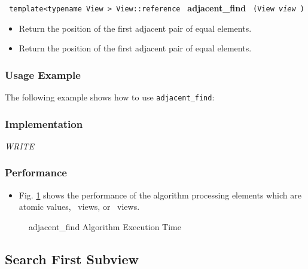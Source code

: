 \noindent
\texttt{%
template<typename View >
\newline
View::reference 
}
\newline
\textbf{adjacent\_find}%
\texttt{%
(View 
\textit{view}%
)
}

\begin{itemize}
\item
Return the position of the first adjacent pair of equal elements. 
\item
Return the position of the first adjacent pair of equal elements. 
\end{itemize}

\subsubsection{Usage Example} %

The following example shows how to use \texttt{adjacent\_find}:

 
\subsubsection{Implementation} %

\textit{WRITE}

\subsubsection{Performance} %

\begin{itemize}
\item
Fig. \ref{fig:adj-find-alg-exec-exper}
shows the performance of the algorithm processing
elements which are atomic values, \stl\ views, or \stapl\ views.
\end{itemize}

\begin{figure}[p]
\caption{adjacent\_find Algorithm Execution Time}
\label{fig:adj-find-alg-exec-exper}
\end{figure}

 
\subsection{Search First Subview} \label{sec-srch-search}

